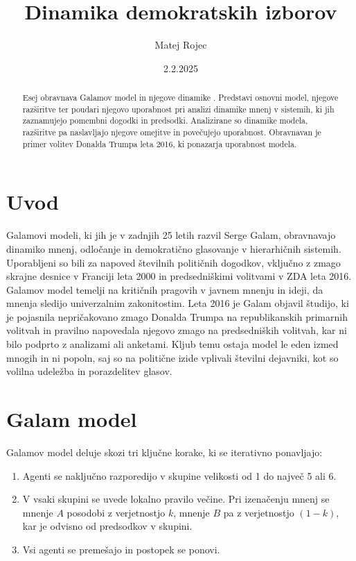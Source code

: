 \documentclass[a4paper,12pt]{article}
\title{Dinamika demokratskih izborov}
\author{Matej Rojec}
\date{2.2.2025}
\begin{document}
\maketitle
\begin{abstract}
Esej obravnava Galamov model in njegove dinamike \cite{galam2015stubbornness,galam2016trump,galam2020tipping}. 
Predstavi osnovni model, njegove razširitve ter poudari njegovo uporabnost pri 
analizi dinamike mnenj v sistemih, ki jih zaznamujejo pomembni dogodki in predsodki. 
Analizirane so dinamike modela, razširitve pa naslavljajo njegove omejitve in 
povečujejo uporabnost. Obravnavan je primer volitev Donalda Trumpa leta 2016, 
ki ponazarja uporabnost modela.
\end{abstract} 

\section{Uvod}

Galamovi modeli, ki jih je v zadnjih 25 letih razvil Serge Galam, obravnavajo dinamiko mnenj, 
odločanje in demokratično glasovanje v hierarhičnih sistemih. 
Uporabljeni so bili za napoved številnih političnih dogodkov, vključno z zmago skrajne desnice 
v Franciji leta 2000 in predsedniškimi volitvami v ZDA leta 2016. Galamov model temelji na 
kritičnih pragovih v javnem mnenju in ideji, da mnenja sledijo univerzalnim zakonitostim. 
Leta 2016 je Galam objavil študijo, ki je pojasnila nepričakovano zmago Donalda Trumpa na 
republikanskih primarnih volitvah in pravilno napovedala njegovo zmago na predsedniških volitvah, 
kar ni bilo podprto z analizami ali anketami. 
Kljub temu ostaja model le eden izmed mnogih in ni popoln, saj so na politične izide vplivali 
številni dejavniki, kot so volilna udeležba in porazdelitev glasov.

\section{Galam model}

Galamov model deluje skozi tri ključne korake, ki se iterativno ponavljajo:   

\begin{enumerate}
\item Agenti se naključno razporedijo v skupine velikosti od 1 do največ 5 ali 6.

\item V vsaki skupini se uvede lokalno pravilo večine. Pri izenačenju mnenj se mnenje $A$ posodobi z 
verjetnostjo $k$, mnenje $B$ pa z verjetnostjo $(1-k)$, kar je odvisno od predsodkov v skupini.

\item Vsi agenti se premešajo in postopek se ponovi.
\end{enumerate}
\end{document}
